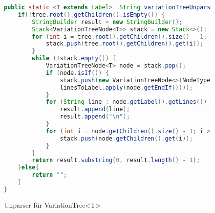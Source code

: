 \begin{figure}[h]
	\centering
\begin{lstlisting}[language=java]
public static <T extends Label>  String variationTreeUnparser(VariationTree<T> tree, Function<List<String>,T> linesToLabel){
	if(!tree.root().getChildren().isEmpty()) {
		StringBuilder result = new StringBuilder();
		Stack<VariationTreeNode<T>> stack = new Stack<>();
		for (int i = tree.root().getChildren().size() - 1; i >= 0; i--) {
			stack.push(tree.root().getChildren().get(i));
		}
		while (!stack.empty()) {
			VariationTreeNode<T> node = stack.pop();
			if (node.isIf()) {
				stack.push(new VariationTreeNode<>(NodeType.ARTIFACT, null, null,
				linesToLabel.apply(node.getEndIf())));
			}
			for (String line : node.getLabel().getLines()) {
				result.append(line);
				result.append("\n");
			}
			for (int i = node.getChildren().size() - 1; i >= 0; i--) {
				stack.push(node.getChildren().get(i));
			}
		}
		return result.substring(0, result.length() - 1);
	}else{
		return "";
	}
}		
\end{lstlisting}	
	\caption{Unparser für VariationTree<T>}
\end{figure}

